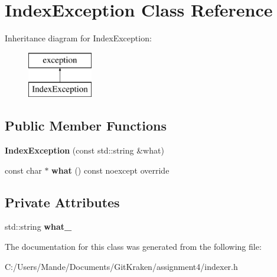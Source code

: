 \hypertarget{class_index_exception}{}\section{Index\+Exception Class Reference}
\label{class_index_exception}
Inheritance diagram for Index\+Exception\+:\begin{figure}[H]
\begin{center}
\leavevmode
\includegraphics[height=2.000000cm]{class_index_exception}
\end{center}
\end{figure}
\subsection*{Public Member Functions}
\begin{DoxyCompactItemize}
\item 
\mbox{\label{class_index_exception_aaa5c1e7c5ada95da91fe81a363434b12}} 
{\bfseries Index\+Exception} (const std\+::string \&what)
\item 
\mbox{\label{class_index_exception_aeec516cf8c8921a5bf3da9b7d3bcf79a}} 
const char $\ast$ {\bfseries what} () const noexcept override
\end{DoxyCompactItemize}
\subsection*{Private Attributes}
\begin{DoxyCompactItemize}
\item 
\mbox{\label{class_index_exception_a1888b5748fcce707a816945a86953e92}} 
std\+::string {\bfseries what\+\_\+}
\end{DoxyCompactItemize}


The documentation for this class was generated from the following file\+:\begin{DoxyCompactItemize}
\item 
C\+:/\+Users/\+Mande/\+Documents/\+Git\+Kraken/assignment4/indexer.\+h\end{DoxyCompactItemize}
